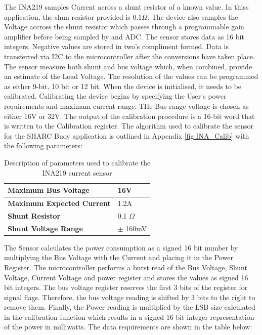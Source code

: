 The INA219 samples Current across a shunt resistor of a known value. In thiss application, the shun resistor provided is $0.1\Omega$. The device also samples the Voltage accross the shunt resistor which passes through a programmable gain amplifier before being sampled by and ADC. The sensor stores data as 16 bit integers. Negative values are stored in two's compliment formed. Data is transferred via I2C to the microcontroller after the conversions have taken place. The sensor measure both shunt and bus voltage which, when combined, provide an estimate of the Load Voltage. The resolution of the values can be programmed as either 9-bit, 10 bit or 12 bit. When the device is initialised, it needs to be calibrated. Calibrating the device begins by specifying the User's power requirements and maximum current range. THe Bus range voltage is chosen as either 16V or 32V. The output of the calibration procedure is a 16-bit word that is written to the Calibration register. The algorithm used to calibrate the sensor for the SHARC Buoy application is outlined in Appendix \ref{fig:INA_Calib} with the following parameters:
\begin{table}[H]
    \centering
    \caption{ Description of parameters used to calibrate the INA219 current sensor}
    \begin{tabular}{|l | l|}
    \hline
         \textbf{Maximum Bus Voltage}& 16V \\
         \hline
         \textbf{Maximum Expected Current} & 1.2A \\
         \hline
         \textbf{Shunt Resistor} & 0.1 $\Omega$ \\
         \hline
         \textbf{Shunt Voltage Range} & $\pm$ 160mV\\
         \hline
    \end{tabular}

    \label{tab:INA_Calib}
\end{table}

The Sensor calculates the power consumption as a signed 16 bit number by multiplying the Bus Voltage with the Current and placing it in the Power Register. The microcontroller performs a burst read of the Bus Voltage, Shunt Voltage, Current Voltage and power register and stores the values as signed 16 bit integers. The bus voltage register reserves the first 3 bits of the register for signal flags. Therefore, the bus voltage reading is shifted by 3 bits to the right to remove them. Finally, the Power reading is multiplied by the LSB size calculated in the calibration function which results in a signed 16 bit integer representation of the power in milliwatts. The data requirements are shown in the table below:

